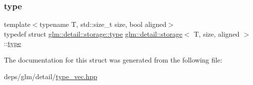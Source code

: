 \subsubsection{\texorpdfstring{type}{type}}
{\footnotesize\ttfamily template$<$typename T, std\+::size\+\_\+t size, bool aligned$>$ \\
typedef struct \hyperlink{structglm_1_1detail_1_1storage_dc/d52/structglm_1_1detail_1_1storage_1_1type}{glm\+::detail\+::storage\+::type}  \hyperlink{structglm_1_1detail_1_1storage}{glm\+::detail\+::storage}$<$ T, size, aligned $>$\+::\hyperlink{structglm_1_1detail_1_1storage_dc/d52/structglm_1_1detail_1_1storage_1_1type}{type}}



The documentation for this struct was generated from the following file\+:\begin{DoxyCompactItemize}
\item 
deps/glm/detail/\hyperlink{type__vec_8hpp}{type\+\_\+vec.\+hpp}\end{DoxyCompactItemize}
